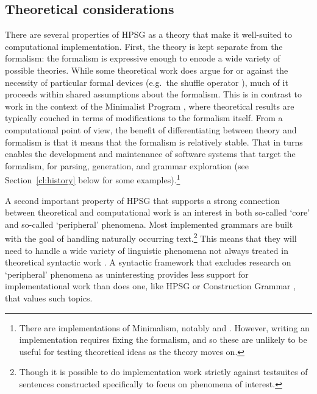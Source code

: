 \documentclass[output=paper]{langsci/langscibook}
\begin{document}

\subsection{Theoretical considerations}
\label{cl:theoretical}

There are several properties of HPSG as a theory that make it well-suited to computational implementation. First, the theory is kept separate from the formalism: the formalism is expressive enough to encode a wide variety of possible theories. While some theoretical work does argue for or against the necessity of particular formal devices (e.g.\ the shuffle operator \citep{FIXME-Reape}), much of it proceeds within shared assumptions about the formalism. This is in contrast to work in the context of the Minimalist Program \citep{Chomsky93b-u}, where theoretical results are typically couched in terms of modifications to the formalism itself. From a computational point of view, the benefit of differentiating between theory and formalism is that it means that the formalism is relatively stable. That in turns enables the development and maintenance of software systems that target the formalism, for parsing, generation, and grammar exploration (see Section~\ref{cl:history} below for some examples).\footnote{There are implementations of Minimalism, notably \citet{FIXME-Stabler} and \citet{FIXME-Indianadiss}. However, writing an implementation requires fixing the formalism, and so these are unlikely to be useful for testing theoretical ideas as the theory moves on.}

A second important property of HPSG that supports a strong connection between theoretical and computational work is an interest in both so-called `core' and so-called `peripheral' phenomena. Most implemented grammars are built with the goal of handling naturally occurring text.\footnote{Though it is possible to do implementation work strictly against testsuites of sentences constructed specifically to focus on phenomena of interest.} This means that they will need to handle a wide variety of linguistic phenomena not always treated in theoretical syntactic work \citep{FIXME-Baldwin-et-al-Beauty}. A syntactic framework that excludes research on `peripheral' phenomena as uninteresting provides less support for implementational work than does one, like HPSG or Construction Grammar \citep{FIXME}, that values such topics.
\end{document}
